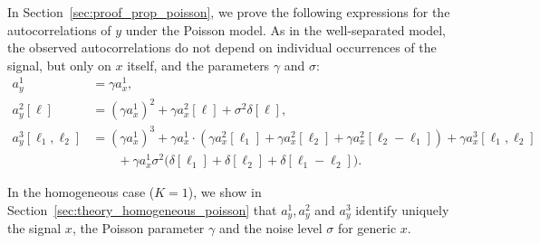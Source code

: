 \documentclass[12pt]{article}
\newcommand{\1}{\mathbf{1}}
\theoremstyle{plain}
\theoremstyle{definition}
\theoremstyle{remark}
\theoremstyle{plain}
\theoremstyle{remark}
\theoremstyle{plain}
\theoremstyle{plain}
\theoremstyle{plain}
\numberwithin{equation}{section}
\begin{document}
In Section~\ref{sec:proof_prop_poisson}, we prove the following expressions for the autocorrelations of $y$ under the Poisson model. As in the well-separated model, the observed autocorrelations do not depend on individual occurrences of the signal, but only on $x$ itself, and the parameters $\gamma$ and $\sigma$:
%
\begin{align}
a_y^1  &=  \gamma a_{x}^1, 
\label{eq:mean_micrograph2} \\
a_y^2[\ell] &=  (\gamma a_x^1)^2 + \gamma a_x^2[\ell] + \sigma^2 \delta[\ell], 
\label{eq:ac2_micrograph2} \\
a_y^3[\ell_1,\ell_2]  & = (\gamma a_x^1)^3 + \gamma a_x^1  
\cdot ( \gamma a_x^2[\ell_1] + \gamma a_x^2[\ell_2]
+ \gamma a_x^2[\ell_2-\ell_1]) + \gamma a_x^3[\ell_1,\ell_2] 
\nonumber \\
& \qquad + \gamma a_x^1 \sigma^2 \big(\delta[\ell_1]+\delta[\ell_2] +\delta[\ell_1-\ell_2] \big).
\label{eq:ac3_micrograph2}
\end{align}

In the homogeneous case ($K=1$), we show in Section~\ref{sec:theory_homogeneous_poisson} that $a_y^1,a_y^2$ and $a_y^3$ identify uniquely the signal $x$, the Poisson parameter $\gamma$ and the noise level $\sigma$ for generic $x$. 
%
\end{document}
